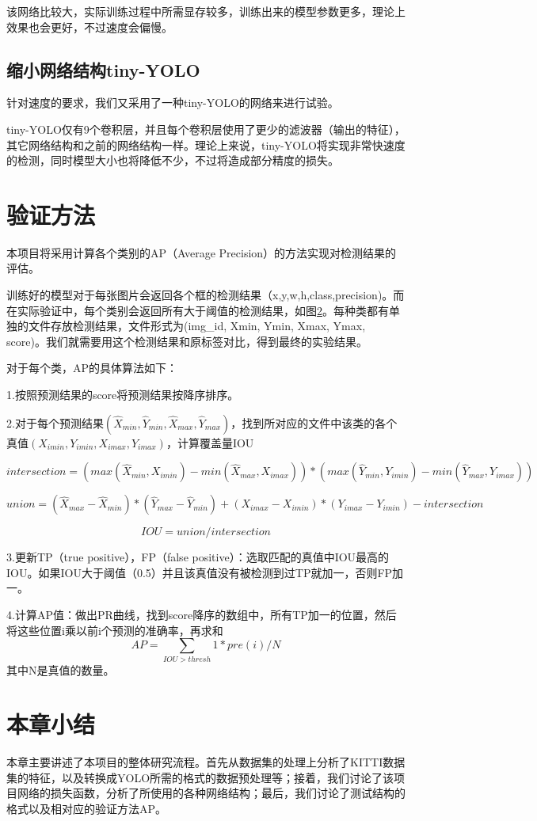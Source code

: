 {{	该网络比较大，实际训练过程中所需显存较多，训练出来的模型参数更多，理论上效果也会更好，不过速度会偏慢。
}

\subsection{缩小网络结构tiny-YOLO}{
	针对速度的要求，我们又采用了一种tiny-YOLO的网络来进行试验。

	tiny-YOLO仅有9个卷积层，并且每个卷积层使用了更少的滤波器（输出的特征），其它网络结构和之前的网络结构一样。理论上来说，tiny-YOLO将实现非常快速度的检测，同时模型大小也将降低不少，不过将造成部分精度的损失。
}
}

\section{验证方法}{
	本项目将采用计算各个类别的AP（Average Precision）的方法实现对检测结果的评估。

	训练好的模型对于每张图片会返回各个框的检测结果（x,y,w,h,class,precision)。而在实际验证中，每个类别会返回所有大于阈值的检测结果，如图\ref{}。每种类都有单独的文件存放检测结果，文件形式为(img\_id, Xmin, Ymin, Xmax, Ymax, score)。我们就需要用这个检测结果和原标签对比，得到最终的实验结果。

	对于每个类，AP的具体算法如下：

	1.按照预测结果的score将预测结果按降序排序。

	2.对于每个预测结果$(\hat{X}_{min},\hat{Y}_{min},\hat{X}_{max},\hat{Y}_{max})$，找到所对应的文件中该类的各个真值$({X}_{imin},{Y}_{imin},{X}_{imax},{Y}_{imax})$，计算覆盖量IOU

	$$intersection = (max(\hat{X}_{min},{X}_{imin}) - min(\hat{X}_{max},{X}_{imax})) * (max(\hat{Y}_{min},{Y}_{imin}) - min(\hat{Y}_{max},{Y}_{imax}))$$

	$$union = (\hat{X}_{max} - \hat{X}_{min}) * (\hat{Y}_{max} - \hat{Y}_{min}) + ({X}_{imax} - {X}_{imin}) * ({Y}_{imax} - {Y}_{imin}) - intersection$$

	$$IOU = union / intersection$$

	3.更新TP（true positive），FP（false positive）：选取匹配的真值中IOU最高的IOU。如果IOU大于阈值（0.5）并且该真值没有被检测到过TP就加一，否则FP加一。

	4.计算AP值：做出PR曲线，找到score降序的数组中，所有TP加一的位置，然后将这些位置i乘以前i个预测的准确率，再求和
	$$AP = \sum_{IOU>thresh}1*pre(i) / N$$其中N是真值的数量。
}

\section{本章小结}{
	本章主要讲述了本项目的整体研究流程。首先从数据集的处理上分析了KITTI数据集的特征，以及转换成YOLO所需的格式的数据预处理等；接着，我们讨论了该项目网络的损失函数，分析了所使用的各种网络结构；最后，我们讨论了测试结构的格式以及相对应的验证方法AP。
}

